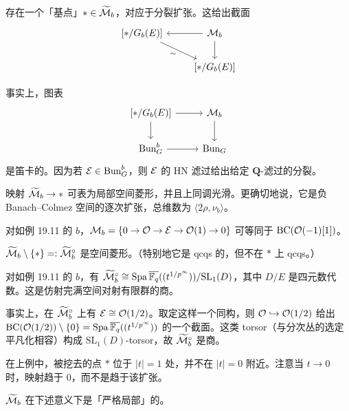 存在一个「基点」$\ast\in\widetilde{\mathcal{M}}_b$，对应于分裂扩张。这给出截面
\[
\begin{tikzcd}
{}[\ast/G_b(E)] \arrow[dr, "\sim"'] & \cM_b \arrow[l] \arrow[d] \\
& {}[\ast/G_b(E)]
\end{tikzcd}
\]

事实上，图表
\[
\begin{tikzcd}
{}[\ast/G_b(E)] \arrow[r] \arrow[d] & \cM_b \arrow[d] \\
\Bun^b_G \arrow[r] & \Bun_G
\end{tikzcd}
\]
是笛卡的。因为若 $\mathcal{E}\in\mathrm{Bun}^b_G$，则 $\mathcal{E}$ 的 HN 滤过给出给定 $\mathbf{Q}$-滤过的分裂。

\begin{center}
\end{center}

\begin{fact}
映射 $\widetilde{\mathcal{M}}_b\to\ast$ 可表为局部空间菱形，并且上同调光滑。更确切地说，它是负 Banach–Colmez 空间的逐次扩张，总维数为 $\langle2\rho,\nu_b\rangle$。
\end{fact}

\begin{example}
对如例 19.11 的 $b$，$\mathcal{M}_b=\{0\to\mathcal{O}\to\mathcal{E}\to\mathcal{O}(1)\to0\}$ 可等同于 $\mathrm{BC}(\mathcal{O}(-1)[1])$。
\end{example}

\begin{fact}
$\widetilde{\mathcal{M}}_b\setminus\{\ast\}=:\widetilde{\mathcal{M}}_b^\circ$ 是空间菱形。（特别地它是 qcqs 的，但不在 $\ast$ 上 qcqs。）
\end{fact}

\begin{example}
对如例 19.11 的 $b$，有 $\widetilde{\mathcal{M}}_b^\circ\cong\operatorname{Spa}\overline{\mathbb{F}_q}((t^{1/p^\infty}))/\mathrm{SL}_1(D)$，其中 $D/E$ 是四元数代数。这是仿射完满空间对射有限群的商。

事实上，在 $\widetilde{\mathcal{M}}_b^\circ$ 上有 $\mathcal{E}\cong\mathcal{O}(1/2)$。取定这样一个同构，则 $\mathcal{O}\hookrightarrow\mathcal{O}(1/2)$ 给出 $\mathrm{BC}(\mathcal{O}(1/2))\setminus\{0\}=\operatorname{Spa}\overline{\mathbb{F}_q}((t^{1/p^\infty}))$ 的一个截面。这类 torsor（与分次丛的选定平凡化相容）构成 $\mathrm{SL}_1(D)$-torsor，故 $\widetilde{\mathcal{M}}_b^\circ$ 是商。
\end{example}

\begin{warning}
在上例中，被挖去的点 $\ast$ 位于 $|t|=1$ 处，并不在 $|t|=0$ 附近。注意当 $t\to0$ 时，映射趋于 $0$，而不是趋于该扩张。
\end{warning}

$\widetilde{\mathcal{M}}_b$ 在下述意义下是「严格局部」的。

